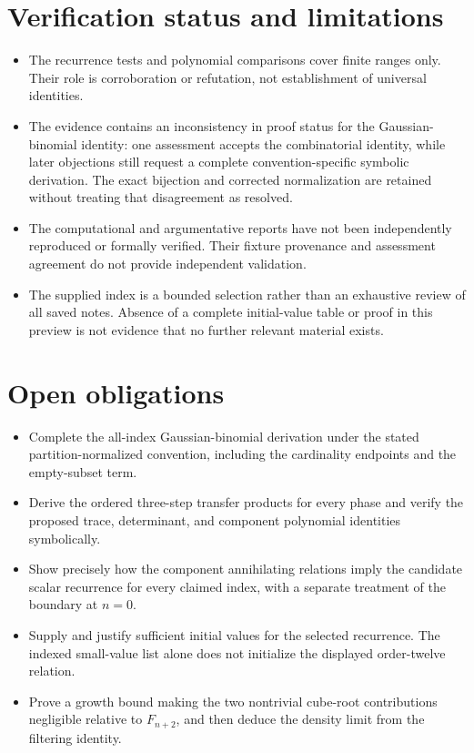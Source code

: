 \documentclass[11pt]{article}
\begin{document}
\section{Verification status and limitations}
\begin{itemize}
\item The recurrence tests and polynomial comparisons cover finite ranges only. Their role is corroboration or refutation, not establishment of universal identities.
\item The evidence contains an inconsistency in proof status for the Gaussian-binomial identity: one assessment accepts the combinatorial identity, while later objections still request a complete convention-specific symbolic derivation. The exact bijection and corrected normalization are retained without treating that disagreement as resolved.
\item The computational and argumentative reports have not been independently reproduced or formally verified. Their fixture provenance and assessment agreement do not provide independent validation.
\item The supplied index is a bounded selection rather than an exhaustive review of all saved notes. Absence of a complete initial-value table or proof in this preview is not evidence that no further relevant material exists.
\end{itemize}
\section{Open obligations}
\begin{itemize}
\item Complete the all-index Gaussian-binomial derivation under the stated partition-normalized convention, including the cardinality endpoints and the empty-subset term.
\item Derive the ordered three-step transfer products for every phase and verify the proposed trace, determinant, and component polynomial identities symbolically.
\item Show precisely how the component annihilating relations imply the candidate scalar recurrence for every claimed index, with a separate treatment of the boundary at $n=0$.
\item Supply and justify sufficient initial values for the selected recurrence. The indexed small-value list alone does not initialize the displayed order-twelve relation.
\item Prove a growth bound making the two nontrivial cube-root contributions negligible relative to $F_{n+2}$, and then deduce the density limit from the filtering identity.
\end{itemize}
\end{document}
